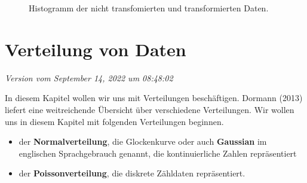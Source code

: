 \documentclass[
  letterpaper,
]{scrbook}
\providecommand{\tightlist}{%
  \setlength{\itemsep}{0pt}\setlength{\parskip}{0pt}}\usepackage{longtable,booktabs,array}
\begin{document}
\begin{figure}

\begin{minipage}[t]{0.50\linewidth}

{\centering 


}

\end{minipage}%
%
\begin{minipage}[t]{0.50\linewidth}

{\centering 


}

\end{minipage}%

\caption{\label{fig-log-scale-4}Histogramm der nicht transfomierten und
transformierten Daten.}

\end{figure}

\hypertarget{verteilung-von-daten}{%
\chapter{Verteilung von Daten}\label{verteilung-von-daten}}

\emph{Version vom September 14, 2022 um 08:48:02}


In diesem Kapitel wollen wir uns mit Verteilungen beschäftigen. Dormann
(2013) liefert eine weitreichende Übersicht über verschiedene
Verteilungen. Wir wollen uns in diesem Kapitel mit folgenden
Verteilungen beginnen.

\begin{itemize}
\tightlist
\item
  der \textbf{Normalverteilung}, die Glockenkurve oder auch
  \textbf{Gaussian} im englischen Sprachgebrauch genannt, die
  kontinuierliche Zahlen repräsentiert
\item
  der \textbf{Poissonverteilung}, die diskrete Zähldaten repräsentiert.
\end{itemize}
\end{document}
